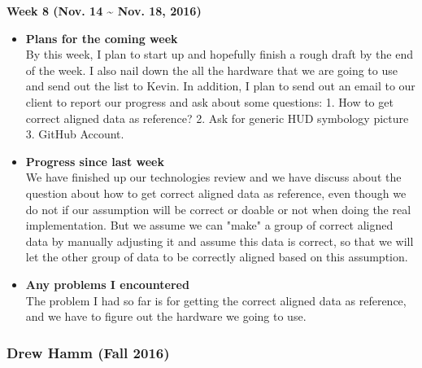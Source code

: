 		\begin{center}
			\textbf{Week 8 (Nov. 14 {\textasciitilde{}} Nov. 18, 2016)}
		\end{center}
		\begin{itemize}
			\item \textbf{Plans for the coming week}
			\\By this week, I plan to start up and hopefully finish a rough draft by the end of the week. I also nail down the all the hardware that we are going to use and send out the list to Kevin. In addition, I plan to send out an email to our client to report our progress and ask about some questions: 1. How to get correct aligned data as reference? 2. Ask for generic HUD symbology picture 3. GitHub Account.\\

			\item \textbf{Progress since last week}
			\\We have finished up our technologies review and we have discuss about the question about how to get correct aligned data as reference, even though we do not if our assumption will be correct or doable or not when doing the real implementation. But we assume we can "make" a group of correct aligned data by manually adjusting it and assume this data is correct, so that we will let the other group of data to be correctly aligned based on this assumption.\\

			\item \textbf{Any problems I encountered}
			\\The problem I had so far is for getting the correct aligned data as reference, and we have to figure out the hardware we going to use.\\
		\end{itemize}



		\subsubsection{Drew Hamm (Fall 2016)}
		\vspace{0.5cm}

